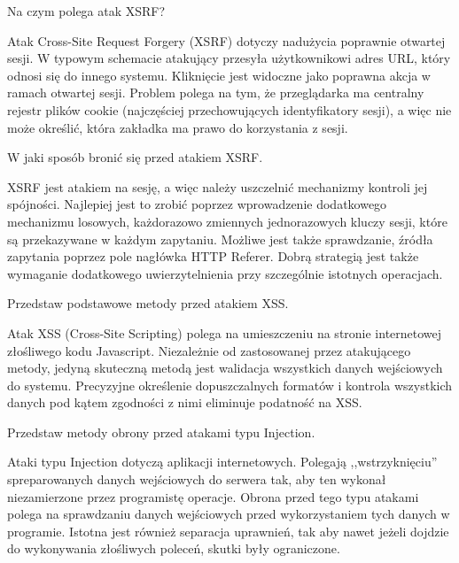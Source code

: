 \documentclass[answers,11pt]{exam}
\begin{document}
\begin{questions}
\question Na czym polega atak XSRF?
\begin{solution}
Atak Cross-Site Request Forgery (XSRF) dotyczy nadużycia poprawnie otwartej sesji. W typowym schemacie atakujący przesyła użytkownikowi adres URL, który odnosi się do innego systemu. Kliknięcie jest widoczne jako poprawna akcja w ramach otwartej sesji. Problem polega na tym, że przeglądarka ma centralny rejestr plików cookie (najczęściej przechowujących identyfikatory sesji), a więc nie może określić, która zakładka ma prawo do korzystania z sesji. 
\end{solution}

\question W jaki sposób bronić się przed atakiem XSRF.
\begin{solution}
XSRF jest atakiem na sesję, a więc należy uszczelnić mechanizmy kontroli jej spójności. Najlepiej jest to zrobić poprzez wprowadzenie dodatkowego mechanizmu losowych, każdorazowo zmiennych jednorazowych kluczy sesji, które są przekazywane w każdym zapytaniu. Możliwe jest także sprawdzanie, źródła zapytania poprzez pole nagłówka HTTP Referer. Dobrą strategią jest także wymaganie dodatkowego uwierzytelnienia przy szczególnie istotnych operacjach. 
\end{solution}


\question Przedstaw podstawowe metody przed atakiem XSS.
\begin{solution}
Atak XSS (Cross-Site Scripting) polega na umieszczeniu na stronie internetowej złośliwego kodu Javascript. Niezależnie od zastosowanej przez atakującego metody, jedyną skuteczną metodą jest walidacja wszystkich danych wejściowych do systemu. Precyzyjne określenie dopuszczalnych formatów i kontrola wszystkich danych pod kątem zgodności z nimi eliminuje podatność na XSS.  
\end{solution}

\question Przedstaw metody obrony przed atakami typu Injection.
\begin{solution}
Ataki typu Injection dotyczą aplikacji internetowych. Polegają ,,wstrzyknięciu'' spreparowanych danych wejściowych do serwera tak, aby ten wykonał niezamierzone przez programistę operacje. 
Obrona przed tego typu atakami polega na sprawdzaniu danych wejściowych przed wykorzystaniem tych danych w programie. Istotna jest również separacja uprawnień, tak aby nawet jeżeli dojdzie do wykonywania złośliwych poleceń, skutki były ograniczone.
\end{solution}


\end{questions}
\end{document}
